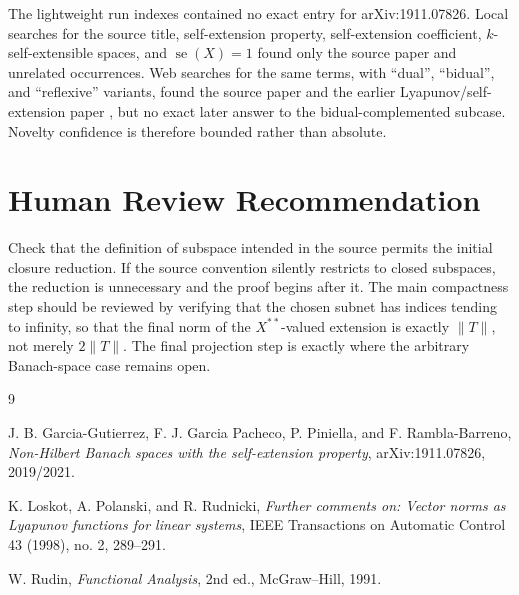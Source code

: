 \documentclass[11pt]{article}
\DeclareMathOperator{\se}{se}
\begin{document}
The lightweight run indexes contained no exact entry for arXiv:1911.07826.
Local searches for the source title, self-extension property, self-extension
coefficient, $k$-self-extensible spaces, and $\se(X)=1$ found only the source
paper and unrelated occurrences. Web searches for the same terms, with
``dual'', ``bidual'', and ``reflexive'' variants, found the source paper
\cite{GGPPR} and the earlier Lyapunov/self-extension paper \cite{LPR}, but no
exact later answer to the bidual-complemented subcase. Novelty confidence is
therefore bounded rather than absolute.

\section*{Human Review Recommendation}

Check that the definition of subspace intended in the source permits the
initial closure reduction. If the source convention silently restricts to
closed subspaces, the reduction is unnecessary and the proof begins after it.
The main compactness step should be reviewed by verifying that the chosen
subnet has indices tending to infinity, so that the final norm of the
$X^{**}$-valued extension is exactly $\|T\|$, not merely $2\|T\|$. The final
projection step is exactly where the arbitrary Banach-space case remains open.

\begin{thebibliography}{9}

J. B. Garcia-Gutierrez, F. J. Garcia Pacheco, P. Piniella, and
F. Rambla-Barreno,
\emph{Non-Hilbert Banach spaces with the self-extension property},
arXiv:1911.07826, 2019/2021.

K. Loskot, A. Polanski, and R. Rudnicki,
\emph{Further comments on: Vector norms as Lyapunov functions for linear systems},
IEEE Transactions on Automatic Control 43 (1998), no. 2, 289--291.

W. Rudin,
\emph{Functional Analysis}, 2nd ed.,
McGraw--Hill, 1991.

\end{thebibliography}
\end{document}
